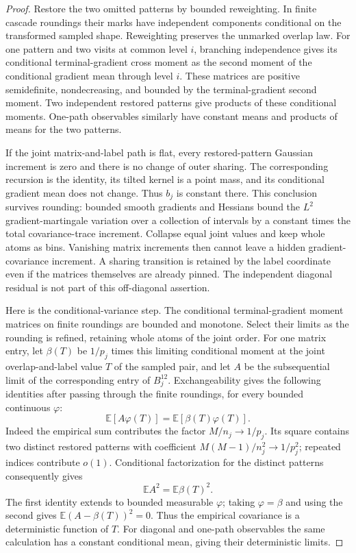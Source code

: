 \documentclass[11pt]{article}
\numberwithin{equation}{section}
\theoremstyle{definition}
\newcommand{\E}{\mathbb E}
\begin{document}
\begin{proof}
Restore the two omitted patterns by bounded reweighting. In finite cascade roundings their marks have independent components conditional on the transformed sampled shape. Reweighting preserves the unmarked overlap law. For one pattern and two visits at common level $i$, branching independence gives its conditional terminal-gradient cross moment as the second moment of the conditional gradient mean through level $i$. These matrices are positive semidefinite, nondecreasing, and bounded by the terminal-gradient second moment. Two independent restored patterns give products of these conditional moments. One-path observables similarly have constant means and products of means for the two patterns.

If the joint matrix-and-label path is flat, every restored-pattern Gaussian increment is zero and there is no change of outer sharing. The corresponding recursion is the identity, its tilted kernel is a point mass, and its conditional gradient mean does not change. Thus $b_j$ is constant there. This conclusion survives rounding: bounded smooth gradients and Hessians bound the $L^2$ gradient-martingale variation over a collection of intervals by a constant times the total covariance-trace increment. Collapse equal joint values and keep whole atoms as bins. Vanishing matrix increments then cannot leave a hidden gradient-covariance increment. A sharing transition is retained by the label coordinate even if the matrices themselves are already pinned. The independent diagonal residual is not part of this off-diagonal assertion.

Here is the conditional-variance step. The conditional terminal-gradient moment matrices on finite roundings are bounded and monotone. Select their limits as the rounding is refined, retaining whole atoms of the joint order. For one matrix entry, let $\beta(T)$ be $1/p_j$ times this limiting conditional moment at the joint overlap-and-label value $T$ of the sampled pair, and let $A$ be the subsequential limit of the corresponding entry of $B_j^{12}$. Exchangeability gives the following identities after passing through the finite roundings, for every bounded continuous $\varphi$:
\[
\E[A\varphi(T)]=\E[\beta(T)\varphi(T)].
\]
Indeed the empirical sum contributes the factor $M/n_j\to1/p_j$. Its square contains two distinct restored patterns with coefficient $M(M-1)/n_j^2\to1/p_j^2$; repeated indices contribute $o(1)$. Conditional factorization for the distinct patterns consequently gives
\[
\E A^2=\E\beta(T)^2.
\]
The first identity extends to bounded measurable $\varphi$; taking $\varphi=\beta$ and using the second gives $\E(A-\beta(T))^2=0$. Thus the empirical covariance is a deterministic function of $T$. For diagonal and one-path observables the same calculation has a constant conditional mean, giving their deterministic limits.


\end{proof}
\end{document}
